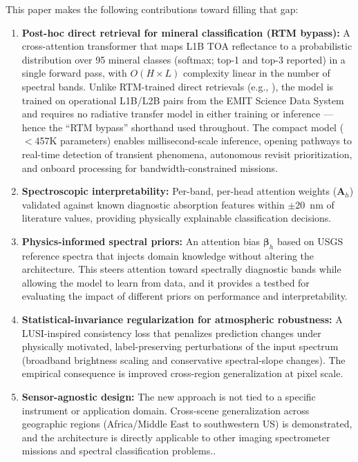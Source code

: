 \documentclass[preprint,12pt]{elsarticle}
\begin{document}
This paper makes the following contributions toward filling that gap:
\begin{enumerate}
  \item \textbf{Post-hoc direct retrieval for mineral classification (RTM bypass):} A cross-attention transformer that maps L1B TOA reflectance to a probabilistic distribution over 95 mineral classes (softmax; top-1 and top-3 reported) in a single forward pass, with $O(H \times L)$ complexity linear in the number of spectral bands. Unlike RTM-trained direct retrievals (e.g., \cite{Keely2025ConditionalDiffusionCO2,Li2022NO2NN}), the model is trained on operational L1B/L2B pairs from the EMIT Science Data System and requires no radiative transfer model in either training or inference --- hence the ``RTM bypass'' shorthand used throughout. The compact model ($<$457K parameters) enables millisecond-scale inference, opening pathways to real-time detection of transient phenomena, autonomous revisit prioritization, and onboard processing for bandwidth-constrained missions.
  \item \textbf{Spectroscopic interpretability:} Per-band, per-head attention weights ($\mathbf{A}_h$) validated against known diagnostic absorption features within $\pm$20~nm of literature values, providing physically explainable classification decisions.
  \item \textbf{Physics-informed spectral priors:} An attention bias $\bm{\beta}_h$ based on USGS reference spectra that injects domain knowledge without altering the architecture. This steers attention toward spectrally diagnostic bands while allowing the model to learn from data, and it provides a testbed for evaluating the impact of different priors on performance and interpretability.
  \item \textbf{Statistical-invariance regularization for atmospheric robustness:} A LUSI-inspired consistency loss that penalizes prediction changes under physically motivated, label-preserving perturbations of the input spectrum (broadband brightness scaling and conservative spectral-slope changes). The empirical consequence is improved cross-region generalization at pixel scale.
  \item \textbf{Sensor-agnostic design:} The new approach is not tied to a specific instrument or application domain.
  Cross-scene generalization across geographic regions (Africa/Middle East to southwestern US) is demonstrated, and the architecture is directly applicable to other imaging spectrometer missions and spectral classification problems..
\end{enumerate}
\end{document}
